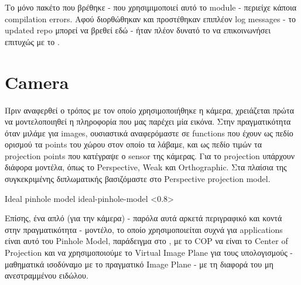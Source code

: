 Το μόνο  πακέτο που βρέθηκε \cite{ros-adafruit-10dof-imu-original} - που χρησιμιμοποιεί αυτό το module - περιείχε κάποια compilation errors. Αφού διορθώθηκαν και προστέθηκαν επιπλέον log messages - το updated repo μπορεί να βρεθεί εδώ \cite{ros-adafruit-10dof-imu-cspyridakis} - ήταν πλέον δυνατό το  να επικοινωνήσει επιτυχώς με το .


\section{Camera} \label{sec:design-implementation-camera}

Πριν αναφερθεί ο τρόπος με τον οποίο χρησιμοποιήθηκε η κάμερα, χρειάζεται πρώτα να μοντελοποιηθεί η πληροφορία που μας παρέχει μία εικόνα. Στην πραγματικότητα όταν μιλάμε για images, ουσιαστικά αναφερόμαστε σε functions που έχουν ως πεδίο ορισμού τα  points του χώρου στον οποίο τα λάβαμε, και ως πεδίο τιμών τα  projection points που κατέγραψε ο sensor της κάμερας. Για το projection υπάρχουν διάφορα μοντέλα, όπως το Perspective, Weak και Orthographic. Στα πλαίσια της συγκεκριμένης διπλωματικής βασιζόμαστε στο Perspective projection model.


%
{Ideal pinhole model}%
{ideal-pinhole-model}%
<0.8>

Επίσης, ένα απλό (για την κάμερα) - παρόλα αυτά αρκετά περιγραφικό και κοντά στην πραγματικότητα - μοντέλο, το οποίο χρησιμοποιείται συχνά για  applications είναι αυτό του Pinhole Model, παράδειγμα στο , με το COP να είναι το Center of Projection και να χρησιμοποιούμε το Virtual Image Plane για τους υπολογισμούς - μαθηματικά ισοδύναμο με το πραγματικό Image Plane - με τη διαφορά του μη ανεστραμμένου ειδώλου.

